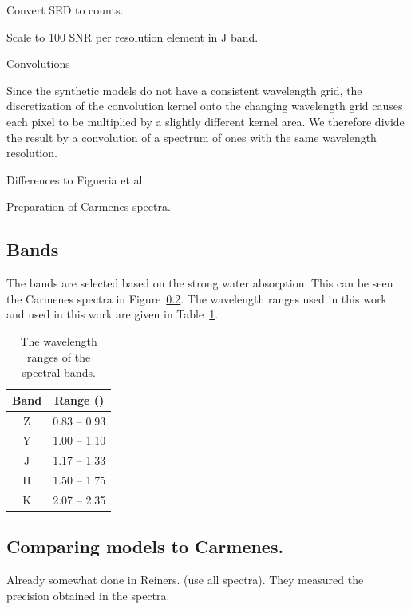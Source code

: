 Convert SED to counts.


Scale to 100 SNR per resolution element in J band.

Convolutions


Since the synthetic models do not have a consistent wavelength grid, the discretization of the convolution kernel onto the changing wavelength grid causes each pixel to be multiplied by a slightly different kernel area. We therefore divide the result by a convolution of a spectrum of ones with the same wavelength resolution.

Differences to Figueria et al.


Preparation of Carmenes spectra.



\subsection{Bands}
The bands are selected based on the strong water absorption. This can be seen the Carmenes spectra in Figure~\ref{}. The wavelength ranges used in this work~\citet{figueira_radial_2016} and used in this work are given in Table~\ref{tab:band_ranges}.
\begin{table}
    \centering
    \caption{The wavelength ranges of the \nir{} spectral bands.}
    \begin{tabular}{cc}
        \toprule
        Band & Range (\um{})\\
        \midrule
        Z & 0.83 -- 0.93\\
        Y & 1.00 -- 1.10\\
        J & 1.17 -- 1.33\\
        H & 1.50 -- 1.75\\
        K & 2.07 -- 2.35\\
        \bottomrule
    \end{tabular}
    \label{tab:band_ranges}
\end{table}



\subsection{Comparing models to Carmenes.}
Already somewhat done in Reiners. (use all spectra). They measured the precision obtained in the spectra.

